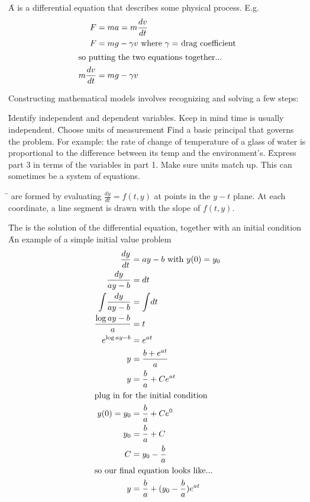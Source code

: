 \begin{itemize}

\f
A  is a differential equation that describes some physical process. E.g.
\begin{align*}
	F &= ma = m\frac{dv}{dt}\\
	F &= mg - \gamma v \text{ where $\gamma = $ drag coefficient}\\
	\intertext{so putting the two equations together...}
	m\frac{dv}{dt} &= mg - \gamma v
\end{align*}

Constructing mathematical models involves recognizing and solving a few steps:
\begin{enumerate}
\f Identify independent and dependent variables. Keep in mind time is usually independent.
\f Choose units of measurement
\f Find a basic principal that governs the problem. For example: the rate of change of temperature of a glass of water is proportional to the difference between its temp and the environment's.
\f Express part 3 in terms of the variables in part 1. Make sure units match up. This can sometimes be a system of equations.
\end{enumerate}

\f {} are formed by evaluating $\frac{dy}{dt} = f(t,y)$ at points in the $y-t$ plane. At each coordinate, a line segment is drawn with the slope of $f(t,y)$. 
\end{itemize}

\begin{itemize}
\f The  is the solution of the differential equation, together with an initial condition
\f An example of a simple initial value problem
\begin{align*}
	\frac{dy}{dt} &= ay - b \text{ with } y(0) = y_0\\
	\frac{dy}{ay - b} &= dt\\
	\int \! \frac{dy}{ay - b} &= \int \! dt\\
	\frac{\log{ay-b}}{a} &= t\\
	e^{\log{ay-b}} &= e^{at}\\
	y &= \frac{b + e^{at}}{a}\\
	y &= \frac{b}{a} + Ce^{at}\\
	\intertext{plug in for the initial condition}
	y(0) = y_0 &= \frac{b}{a} + Ce^{0}\\
	y_0 &= \frac{b}{a} + C\\
	C &= y_0 - \frac{b}{a}\\
	\intertext{so our final equation looks like...}
	y &= \frac{b}{a} + (y_0 - \frac{b}{a})e^{at}\\
\end{align*}
\end{itemize}

